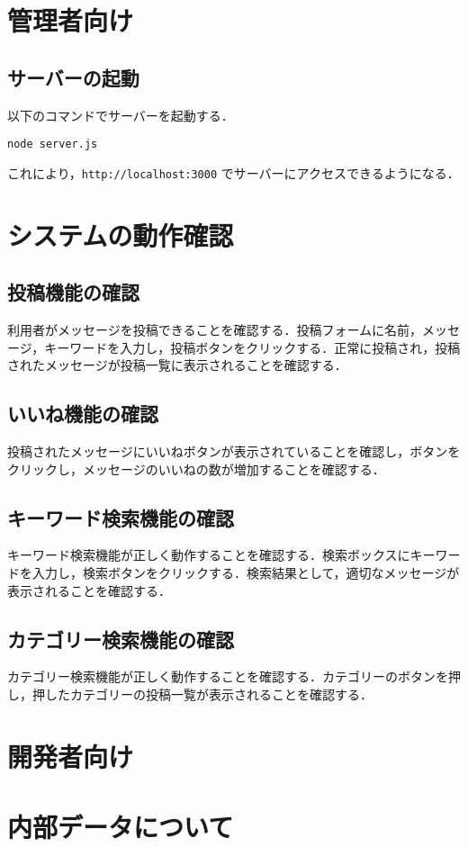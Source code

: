 \documentclass[uplatex,dvipdfmx]{jsarticle}
\begin{document}
\section{管理者向け}
\subsection{サーバーの起動}
以下のコマンドでサーバーを起動する．
\begin{verbatim}
node server.js
\end{verbatim}
これにより，\texttt{http://localhost:3000} でサーバーにアクセスできるようになる．
\section{システムの動作確認}
\subsection{投稿機能の確認}
利用者がメッセージを投稿できることを確認する．投稿フォームに名前，メッセージ，キーワードを入力し，投稿ボタンをクリックする．正常に投稿され，投稿されたメッセージが投稿一覧に表示されることを確認する．
\subsection{いいね機能の確認}
投稿されたメッセージにいいねボタンが表示されていることを確認し，ボタンをクリックし，メッセージのいいねの数が増加することを確認する．
\subsection{キーワード検索機能の確認}
キーワード検索機能が正しく動作することを確認する．検索ボックスにキーワードを入力し，検索ボタンをクリックする．検索結果として，適切なメッセージが表示されることを確認する．
\subsection{カテゴリー検索機能の確認}
カテゴリー検索機能が正しく動作することを確認する．カテゴリーのボタンを押し，押したカテゴリーの投稿一覧が表示されることを確認する．

\section{開発者向け}
\section{内部データについて}
\end{document}
